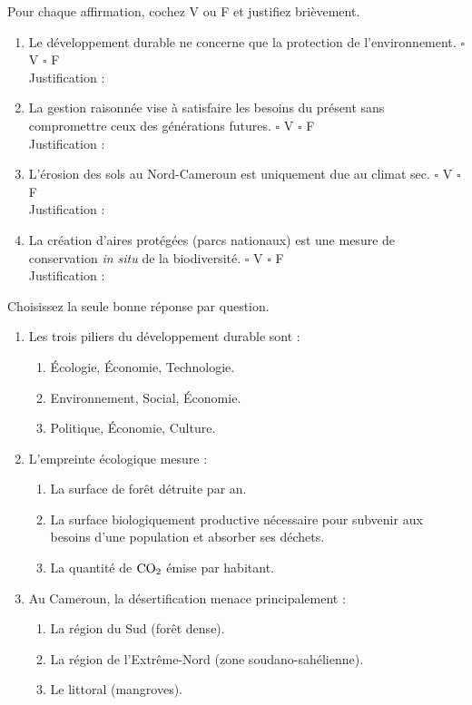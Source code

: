 \documentclass[11pt]{article}
\begin{document}
\begin{exercice}
Pour chaque affirmation, cochez V ou F et justifiez brièvement.
\begin{enumerate}
    \item Le développement durable ne concerne que la protection de l'environnement. \hfill $\square$ V $\square$ F \\
    Justification :
    \item La gestion raisonnée vise à satisfaire les besoins du présent sans compromettre ceux des générations futures. \hfill $\square$ V $\square$ F \\
    Justification :
    \item L'érosion des sols au Nord-Cameroun est uniquement due au climat sec. \hfill $\square$ V $\square$ F \\
    Justification :
    \item La création d'aires protégées (parcs nationaux) est une mesure de conservation \textit{in situ} de la biodiversité. \hfill $\square$ V $\square$ F \\
    Justification :
\end{enumerate}
\end{exercice}

\begin{exercice}
Choisissez la seule bonne réponse par question.
\begin{enumerate}
    \item Les trois piliers du développement durable sont :
    \begin{enumerate}
        \item Écologie, Économie, Technologie.
        \item Environnement, Social, Économie.
        \item Politique, Économie, Culture.
    \end{enumerate}
    \item L'empreinte écologique mesure :
    \begin{enumerate}
        \item La surface de forêt détruite par an.
        \item La surface biologiquement productive nécessaire pour subvenir aux besoins d'une population et absorber ses déchets.
        \item La quantité de $\ce{CO2}$ émise par habitant.
    \end{enumerate}
    \item Au Cameroun, la désertification menace principalement :
    \begin{enumerate}
        \item La région du Sud (forêt dense).
        \item La région de l'Extrême-Nord (zone soudano-sahélienne).
        \item Le littoral (mangroves).
    \end{enumerate}
\end{enumerate}
\end{exercice}
\end{document}
